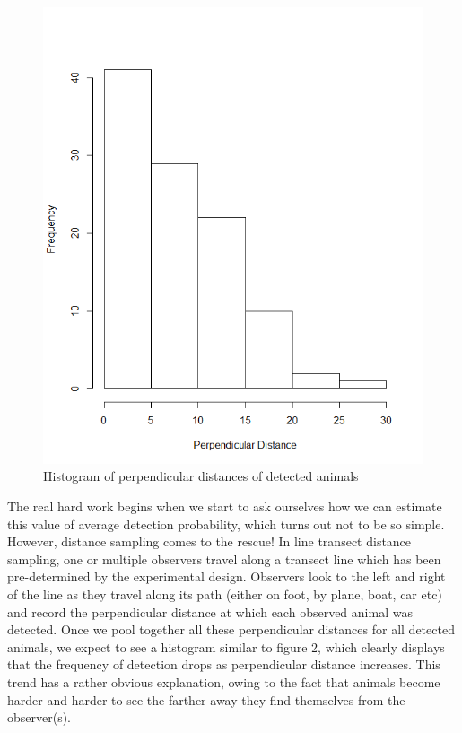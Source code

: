 \documentclass[11pt]{article}
\begin{document}
\begin{multicols}{2}
\begin{figure}[H]
\includegraphics[scale=0.5]{DistanceHist}
\caption{Histogram of perpendicular distances of detected animals}
\end{figure}

The real hard work begins when we start to ask ourselves how we can estimate this value of average detection probability, which turns out not to be so simple. However, distance sampling comes to the rescue!  In line transect distance sampling, one or multiple observers travel along a transect line which has been pre-determined by the experimental design. Observers look to the left and right of the line as they travel along its path (either on foot, by plane, boat, car etc) and record the perpendicular distance at which each observed animal was detected. Once we pool together all these perpendicular distances for all detected animals, we expect to see a histogram similar to figure 2, which clearly displays that the frequency of detection drops as perpendicular distance increases. This trend has a rather obvious explanation, owing to the fact that animals become harder and harder to see the farther away they find themselves from the observer(s).




\end{multicols}
\end{document}
